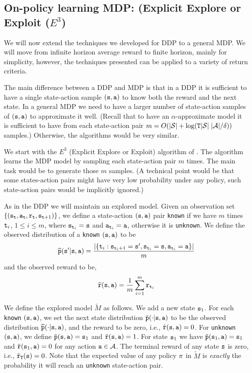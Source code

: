 \subsection{On-policy learning MDP: (Explicit Explore or Exploit ($E^3$)}

We will now extend the techniques we developed for DDP to a general
MDP. We will move from infinite horizon average reward to finite
horizon, mainly for simplicity, however, the techniques presented
can be applied to a variety of return criteria.

The main difference between a DDP and MDP is that in a DDP it is sufficient to have a single state-action sample $({\tt s},{\tt a})$ to know both the reward and the next state. In a general MDP we need to have a larger number of state-action samples of $({\tt s},{\tt a})$ to approximate it well. (Recall that to have an $\alpha$-approximate model it is sufficient to have from each state-action pair $m=O(|\mathcal{S}|+\log({\tt T} |\mathcal{S}|\;|\mathcal{A}|/\delta))$ samples.)
Otherwise, the algorithms would be very similar.

We start with the $E^3$ (Explicit Explore or Exploit) algorithm of
\cite{KearnsS02}. The algorithm learns the MDP model by sampling
each state-action pair $m$ times. The main task would be to generate
those $m$ samples. (A technical point would be that some
states-action pairs might have very low probability under any
policy, such state-action pairs would be implicitly ignored.)

As in the DDP we will maintain an explored model. Given an
observation set $\{({\tt s}_{\tt t},{\tt a}_{\tt t} ,{\tt r}_{\tt t},
{\tt s}_{{\tt t}+1})\}$, we define a state-action $({\tt s},{\tt a})$
pair \texttt{known} if we have $m$ times ${\tt t}_i$, $1\leq i \leq m$,
where ${\tt s}_{{\tt t}_i}={\tt s}$ and ${\tt a}_{{\tt t}_i}={\tt a}$,
otherwise it is \texttt{unknown}. We define the observed distribution
of a \texttt{known} $({\tt s},{\tt a})$ to be
\[
\widehat{{\tt p}}({\tt s}'|{\tt s},{\tt a})= \frac{|\{{\tt t}_i
:{\tt s}_{{\tt t}_i+1}={\tt s}',{\tt s}_{{\tt t}_i}={\tt s},{\tt a}_{{\tt t}_i}={\tt a}\}|}{m}
\]
and the observed reward to be,
\[
\widehat{{\tt r}}({\tt s},{\tt a})=\frac{1}{m}\sum_{i=1}^m
{\tt r}_{{\tt t}_i}
\]


We define the explored model $\widetilde{M}$ as follows. We add a new
state ${\tt s}_1$. For each \texttt{known} $({\tt s},{\tt a})$, we set the next
state distribution $\tilde{{\tt p}}(\cdot|{\tt s},{\tt a})$ to be the
observed distribution $\widehat{{\tt p}}(\cdot|{\tt s},{\tt a})$, and the
reward to be zero, i.e., $\tilde{{\tt r}}({\tt s},{\tt a})=0$.
%
For \texttt{unknown} $({\tt s},{\tt a})$, we define
$\tilde{{\tt p}}({\tt s},{\tt a})={\tt s}_1$ and
$\tilde{{\tt r}}({\tt s},{\tt a})=1$. For state ${\tt s}_1$ we
have $\tilde{{\tt p}}({\tt s}_1,{\tt a})={\tt s}_1$ and
$\tilde{{\tt r}}({\tt s}_1,{\tt a})=0$ for any action
${\tt a}\in\mathcal{A}$.
The terminal reward of any state ${\tt s}$ is zero, i.e., $\tilde{{\tt r}}_{\tt T}({\tt s})=0$.
%
Note that the expected value of any policy $\pi$ in $\widetilde{M}$
is {\em exactly} the probability it will reach an \texttt{unknown}
state-action pair.


